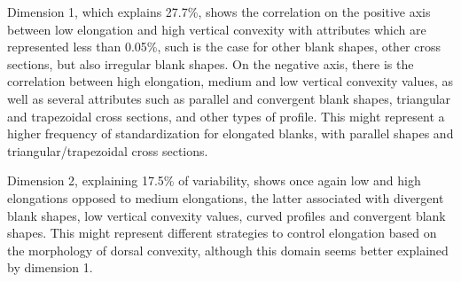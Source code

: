 \documentclass[12pt,twoside]{reedthesis}
\begin{document}
Dimension 1, which explains 27.7\%, shows the correlation on the positive axis between low elongation and high vertical convexity with attributes which are represented less than 0.05\%, such is the case for other blank shapes, other cross sections, but also irregular blank shapes. On the negative axis, there is the correlation between high elongation, medium and low vertical convexity values, as well as several attributes such as parallel and convergent blank shapes, triangular and trapezoidal cross sections, and other types of profile. This might represent a higher frequency of standardization for elongated blanks, with parallel shapes and triangular/trapezoidal cross sections.

Dimension 2, explaining 17.5\% of variability, shows once again low and high elongations opposed to medium elongations, the latter associated with divergent blank shapes, low vertical convexity values, curved profiles and convergent blank shapes. This might represent different strategies to control elongation based on the morphology of dorsal convexity, although this domain seems better explained by dimension 1.
\end{document}
